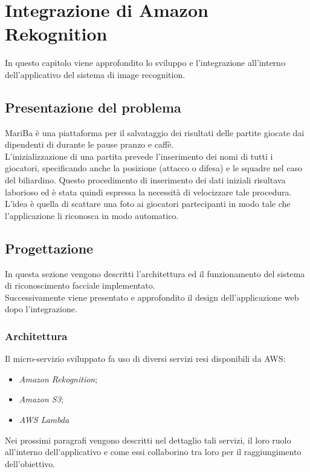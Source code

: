 
\chapter{Integrazione di Amazon Rekognition}
\label{cap:rekognition}

In questo capitolo viene approfondito lo sviluppo e l'integrazione all'interno dell'applicativo del sistema di image recognition.\\


\section{Presentazione del problema}
MariBa è una piattaforma per il salvataggio dei risultati delle partite giocate dai dipendenti di \azienda durante le 
pause pranzo e caffè. \\
L'inizializzazione di una partita prevede l'inserimento dei nomi di tutti i giocatori, specificando anche la posizione (attacco o difesa) e le squadre nel caso del biliardino. Questo procedimento di inserimento dei dati iniziali
risultava laborioso ed è stata quindi espressa la necessità di velocizzare tale procedura. \\
L'idea è quella di scattare una foto ai giocatori partecipanti in modo tale che l'applicazione li riconosca in modo automatico.

\section{Progettazione}
In questa sezione vengono descritti l'architettura ed il funzionamento del sistema di riconoscimento facciale implementato. \\
Successivamente viene presentato e approfondito il design dell'applicazione web dopo l'integrazione.

	\subsection{Architettura}
	 Il micro-servizio sviluppato fa uso di diversi servizi resi disponibili da \gls{AWS}: 
	 \begin{itemize}
	 	\item \emph{Amazon Rekognition};
	 	\item \emph{Amazon S3};
	 	\item \emph{AWS Lambda}
	 \end{itemize}
 	Nei prossimi paragrafi vengono descritti nel dettaglio tali servizi, il loro ruolo all'interno dell'applicativo e come essi collaborino tra loro per il raggiungimento dell'obiettivo.
	
